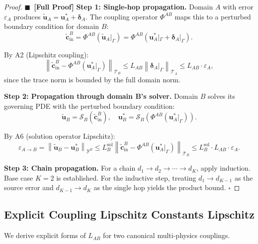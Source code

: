 \documentclass[11pt,a4paper]{article}
\theoremstyle{definition}
\newcommand{\rigorFull}[0]{$\blacksquare$~\textbf{[Full Proof]}}
\newcommand{\norm}[1]{\left\lVert#1\right\rVert}
\newcommand{\interface}{\Gamma}
\begin{document}
\begin{proof}\rigorFull
\textbf{Step 1: Single-hop propagation.} Domain $A$ with error $\varepsilon_A$ produces $\tilde{\mathbf{u}}_A = \mathbf{u}_A^* + \boldsymbol{\delta}_A$. The coupling operator $\Phi^{AB}$ maps this to a perturbed boundary condition for domain $B$:
\begin{equation}
\tilde{\mathbf{c}}_{\mathrm{in}}^B = \Phi^{AB}(\tilde{\mathbf{u}}_A|_\interface) = \Phi^{AB}(\mathbf{u}_A^*|_\interface + \boldsymbol{\delta}_A|_\interface).
\end{equation}

By A2 (Lipschitz coupling):
\begin{equation}
\norm{\tilde{\mathbf{c}}_{\mathrm{in}}^B - \Phi^{AB}(\mathbf{u}_A^*|_\interface)}_{\mathcal{T}_B} \leq L_{AB} \norm{\boldsymbol{\delta}_A|_\interface}_{\mathcal{T}_A} \leq L_{AB} \cdot \varepsilon_A,
\end{equation}
since the trace norm is bounded by the full domain norm.

\textbf{Step 2: Propagation through domain B's solver.} Domain $B$ solves its governing PDE with the perturbed boundary condition:
\begin{equation}
\tilde{\mathbf{u}}_B = \mathcal{S}_B(\tilde{\mathbf{c}}_{\mathrm{in}}^B), \quad \mathbf{u}_B^* = \mathcal{S}_B(\Phi^{AB}(\mathbf{u}_A^*|_\interface)).
\end{equation}

By A6 (solution operator Lipschitz):
\begin{equation}
\varepsilon_{A \to B} = \norm{\tilde{\mathbf{u}}_B - \mathbf{u}_B^*}_{\mathcal{Y}^B} \leq L_B^{\mathrm{sol}} \norm{\tilde{\mathbf{c}}_{\mathrm{in}}^B - \Phi^{AB}(\mathbf{u}_A^*|_\interface)}_{\mathcal{T}_B} \leq L_B^{\mathrm{sol}} \cdot L_{AB} \cdot \varepsilon_A.
\end{equation}

\textbf{Step 3: Chain propagation.} For a chain $d_1 \to d_2 \to \cdots \to d_K$, apply induction. Base case $K=2$ is established. For the inductive step, treating $d_1 \to d_{K-1}$ as the source error and $d_{K-1} \to d_K$ as the single hop yields the product bound. $\square$
\end{proof}

\subsection{Explicit Coupling Lipschitz Constants Lipschitz}

We derive explicit forms of $L_{AB}$ for two canonical multi-physics couplings.
\end{document}
